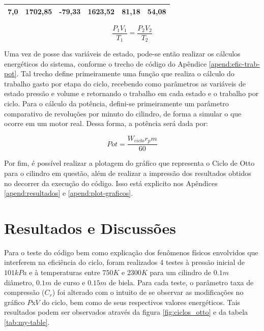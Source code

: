\documentclass[10pt, conference, letterpaper]{IEEEtran}
\begin{document}
\begin{table}[hb]
\begin{tabular}{|c|c|c|c|c|c|}
7,0                                                                                     & 1702,85                                                                             & -79,33                                                                                & 1623,52                                                                                     & 81,18                                                                                 & 54,08                            \\ \hline
\end{tabular}
\end{table}

\begin{equation}
    \frac{P_1V_1}{T_1} = \frac{P_2V_2}{T_2}\label{17}
\end{equation}

Uma vez de posse das variáveis de estado, pode-se então realizar os cálculos energéticos do sistema, conforme o trecho de código do Apêndice \ref{apend:efic-trab-pot}. Tal trecho define primeiramente uma função que realiza o cálculo do trabalho gasto por etapa do ciclo, recebendo como parâmetros as variáveis de estado pressão e volume e retornando o trabalho em cada estado e o trabalho por ciclo. Para o cálculo da potência, defini-se primeiramente um parâmetro comparativo de revoluções por minuto do cilindro, de forma a simular o que ocorre em um motor real. Dessa forma, a potência será dada por:

\begin{equation}
    Pot = \frac{W_{ciclo}r_pm}{60}
\end{equation}

Por fim, é possível realizar a plotagem do gráfico que representa o Ciclo de Otto para o cilindro em questão, além de realizar a impressão dos resultados obtidos no decorrer da execução do código. Isso está explicito nos Apêndices \ref{apend:resultados} e \ref{apend:plot-graficos}. 

\section{Resultados e Discussões}
Para o teste do código bem como explicação dos fenômenos físicos envolvidos que interferem na eficiência do ciclo, foram realizados 4 testes à pressão inicial de $101kPa$ e à temperaturas entre $750K$ e $2300K$ para um cilindro de $0.1 m$ diâmetro, $0.1 m$ de curso e $0.15 m$ de biela. Para cada teste, o parâmetro taxa de compressão ($C_r$) foi alterado com o intuito de se observar as modificações no gráfico $P$x$V$ do ciclo, bem como de seus respectivos valores energéticos. Tais resultados podem ser observados através da figura \ref{fig:ciclos_otto} e da tabela \ref{tab:my-table}.
\end{document}
